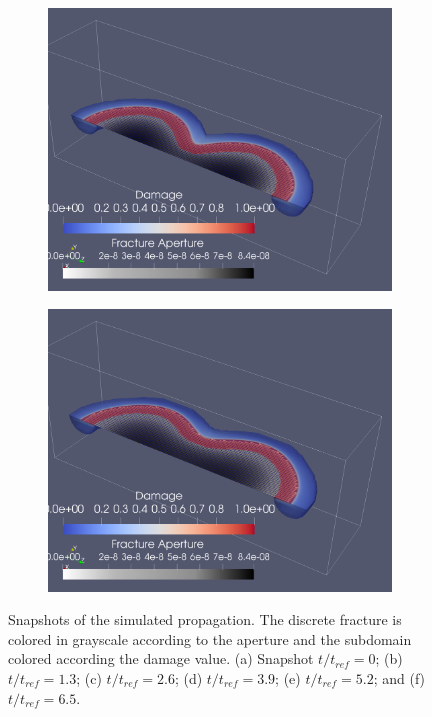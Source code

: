 \begin{figure}[h]
\begin{subfigure}{.45\textwidth}
  \centering
  \includegraphics[width=\linewidth]{Chapter4/figures/merging/merge_t_45(1).png}
  \caption{}
  \label{fig:merge_t_4}
\end{subfigure}
\hspace{0.85cm}
\begin{subfigure}{.45\textwidth}
  \centering
  \includegraphics[width=\linewidth]{Chapter4/figures/merging/merge_t_67(1).png}
  \caption{}
  \label{fig:merge_t_5}
\end{subfigure}
  \caption{Snapshots of the simulated propagation. The discrete fracture is colored in grayscale according to the aperture and the subdomain colored according the damage value. (a) Snapshot $t/t_{ref} = 0$; (b) $t/t_{ref} = 1.3$; (c) $t/t_{ref} = 2.6$; (d) $t/t_{ref} = 3.9$; (e) $t/t_{ref} = 5.2$; and (f) $t/t_{ref} = 6.5$. } 
  \label{fig:merge_snapshots}  
\end{figure}

\FloatBarrier


